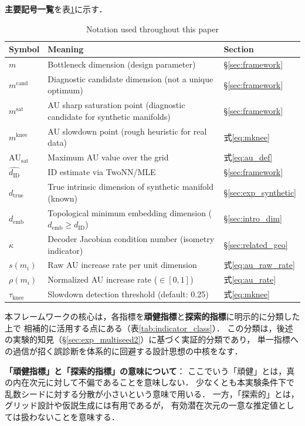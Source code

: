 \documentclass[11pt,a4paper]{jsarticle}
\newcommand{\dID}{d_{\mathrm{ID}}}
\newcommand{\dzopt}{m^{\mathrm{cand}}}
\newcommand{\dtrue}{d_{\mathrm{true}}}
\newcommand{\kap}{\kappa}
\newcommand{\AUsat}{\mathrm{AU}_{\mathrm{sat}}}
\newcommand{\dzsat}{m^{\mathrm{sat}}}
\newcommand{\mknee}{m^{\mathrm{knee}}}
\newcommand{\demb}{d_{\mathrm{emb}}}
\begin{document}
\textbf{主要記号一覧}を表\ref{tab:notation}に示す．

\begin{table}[H]
\centering
\caption{Notation used throughout this paper}
\label{tab:notation}
\small
\begin{tabular}{lll}
\toprule
Symbol & Meaning & Section \\
\midrule
$m$ & Bottleneck dimension (design parameter) & §\ref{sec:framework} \\
$\dzopt$ & Diagnostic candidate dimension (not a unique optimum) & §\ref{sec:framework} \\
$\dzsat$ & AU sharp saturation point (diagnostic candidate for synthetic manifolds) & §\ref{sec:framework} \\
$\mknee$ & AU slowdown point (rough heuristic for real data) & 式\eqref{eq:mknee} \\
$\AUsat$ & Maximum AU value over the grid & 式\eqref{eq:au_def} \\
$\hat{\dID}$ & ID estimate via TwoNN/MLE & §\ref{sec:framework} \\
$\dtrue$ & True intrinsic dimension of synthetic manifold (known) & §\ref{sec:exp_synthetic} \\
$\demb$ & Topological minimum embedding dimension ($\demb \geq \dID$) & §\ref{sec:intro_dim} \\
$\kap$ & Decoder Jacobian condition number (isometry indicator) & §\ref{sec:related_geo} \\
$s(m_i)$ & Raw AU increase rate per unit dimension & 式\eqref{eq:au_raw_rate} \\
$\rho(m_i)$ & Normalized AU increase rate ($\in[0,1]$) & 式\eqref{eq:au_rate} \\
$\tau_{\mathrm{knee}}$ & Slowdown detection threshold (default: 0.25) & 式\eqref{eq:mknee} \\
\bottomrule
\end{tabular}
\end{table}

本フレームワークの核心は，各指標を\textbf{頑健指標}と\textbf{探索的指標}に明示的に分類した上で
相補的に活用する点にある（表\ref{tab:indicator_class}）．
この分類は，後述の実験的知見（§\ref{sec:exp_multiseed2}）に基づく実証的分類であり，
単一指標への過信が招く誤診断を体系的に回避する設計思想の中核をなす．

\textbf{「頑健指標」と「探索的指標」の意味について}：
ここでいう「頑健」とは，真の内在次元に対して不偏であることを意味しない．
少なくとも本実験条件下で乱数シードに対する分散が小さいという意味で用いる．
一方，「探索的」とは，グリッド設計や仮説生成には有用であるが，
有効潜在次元の一意な推定値としては扱わないことを意味する．
\end{document}
